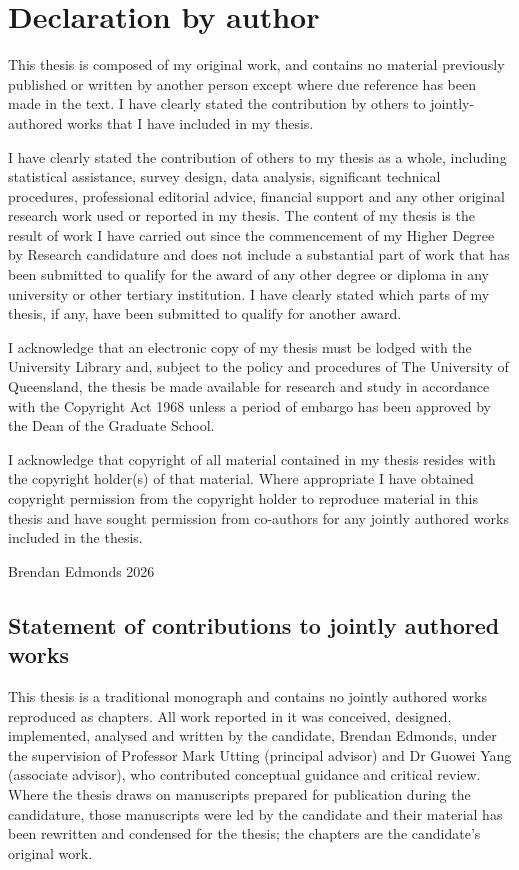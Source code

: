 \chapter*{Declaration by author}

This thesis is composed of my original work, and contains no material previously
published or written by another person except where due reference has been made
in the text. I have clearly stated the contribution by others to jointly-authored
works that I have included in my thesis.

I have clearly stated the contribution of others to my thesis as a whole,
including statistical assistance, survey design, data analysis, significant
technical procedures, professional editorial advice, financial support and any
other original research work used or reported in my thesis. The content of my
thesis is the result of work I have carried out since the commencement of my
Higher Degree by Research candidature and does not include a substantial part of
work that has been submitted to qualify for the award of any other degree or
diploma in any university or other tertiary institution. I have clearly stated
which parts of my thesis, if any, have been submitted to qualify for another
award.

I acknowledge that an electronic copy of my thesis must be lodged with the
University Library and, subject to the policy and procedures of The University of
Queensland, the thesis be made available for research and study in accordance
with the Copyright Act 1968 unless a period of embargo has been approved by the
Dean of the Graduate School.

I acknowledge that copyright of all material contained in my thesis resides with
the copyright holder(s) of that material. Where appropriate I have obtained
copyright permission from the copyright holder to reproduce material in this
thesis and have sought permission from co-authors for any jointly authored works
included in the thesis.

\vspace{2cm}
\noindent Brendan Edmonds \hfill 2026%

\bigskip

\section*{Statement of contributions to jointly authored works}

This thesis is a traditional monograph and contains no jointly authored works
reproduced as chapters. All work reported in it was conceived, designed,
implemented, analysed and written by the candidate, Brendan Edmonds, under the
supervision of Professor Mark Utting (principal advisor) and Dr Guowei Yang
(associate advisor), who contributed conceptual guidance and critical review.
Where the thesis draws on manuscripts prepared for publication during the
candidature, those manuscripts were led by the candidate and their material has
been rewritten and condensed for the thesis; the chapters are the candidate's
original work. %
